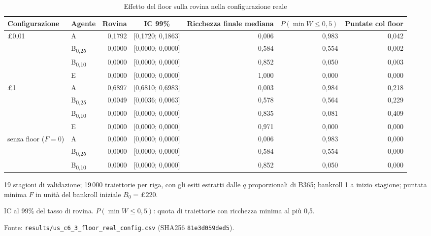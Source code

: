 \begin{table}[htbp]
\centering
\small
\caption{Effetto del floor sulla rovina nella configurazione reale}
\label{tab:c6_3_floor_reale}
\begin{tabular}{llrcrrr}
\toprule
Configurazione & Agente & Rovina & IC 99\% & Ricchezza finale mediana & $P(\min W \le 0{,}5)$ & Puntate col floor \\
\midrule
\pounds{}0,01 & A & 0,1792 & [0,1720; 0,1863] & 0,006 & 0,983 & 0,042 \\
 & B\textsubscript{0,25} & 0,0000 & [0,0000; 0,0000] & 0,584 & 0,554 & 0,002 \\
 & B\textsubscript{0,10} & 0,0000 & [0,0000; 0,0000] & 0,852 & 0,050 & 0,003 \\
 & E & 0,0000 & [0,0000; 0,0000] & 1,000 & 0,000 & 0,000 \\
\midrule
\pounds{}1 & A & 0,6897 & [0,6810; 0,6983] & 0,003 & 0,984 & 0,218 \\
 & B\textsubscript{0,25} & 0,0049 & [0,0036; 0,0063] & 0,578 & 0,564 & 0,229 \\
 & B\textsubscript{0,10} & 0,0000 & [0,0000; 0,0000] & 0,835 & 0,081 & 0,409 \\
 & E & 0,0000 & [0,0000; 0,0000] & 0,971 & 0,000 & 0,000 \\
\midrule
senza floor ($F = 0$) & A & 0,0000 & [0,0000; 0,0000] & 0,006 & 0,983 & 0,000 \\
 & B\textsubscript{0,25} & 0,0000 & [0,0000; 0,0000] & 0,584 & 0,554 & 0,000 \\
 & B\textsubscript{0,10} & 0,0000 & [0,0000; 0,0000] & 0,852 & 0,050 & 0,000 \\
\bottomrule
\end{tabular}

\smallskip
\begin{minipage}{\linewidth}
\footnotesize
19 stagioni di validazione; 19\,000 traiettorie per riga, con gli esiti estratti dalle $q$ proporzionali di B365; bankroll 1 a inizio stagione; puntata minima $F$ in unità del bankroll iniziale $B_0 = \pounds{}220$.\par
IC al 99\% del tasso di rovina. $P(\min W \le 0{,}5)$: quota di traiettorie con ricchezza minima al più 0,5.\par
Fonte: \texttt{results/us\_c6\_3\_floor\_real\_config.csv} (SHA256 \texttt{81e3d059ded5}).
\end{minipage}
\end{table}

